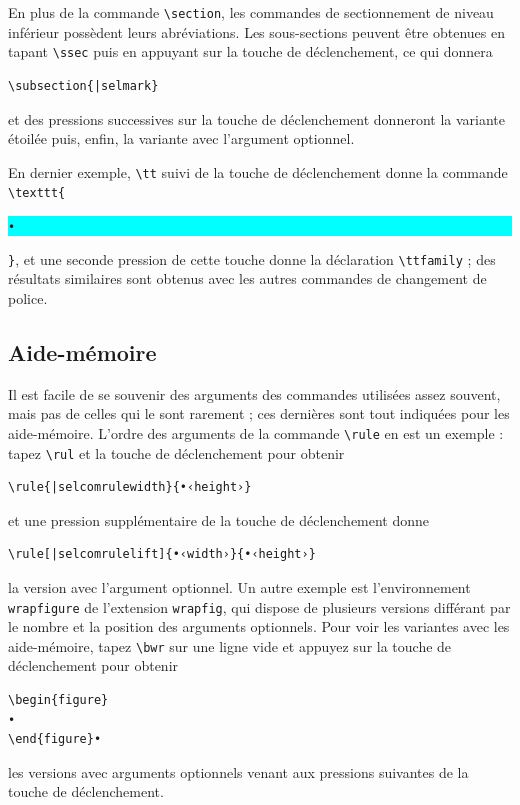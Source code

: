 \documentclass[11pt]{article}
\newcommand{\selmark}{\colorbox{cyan}{\rule[-0.5ex]{0ex}{2.1ex}\texttt{•}}}
\begin{document}
En plus de la commande \verb|\section|, les commandes de sectionnement de niveau inférieur possèdent leurs abréviations. Les sous-sections peuvent être obtenues en tapant \verb|\ssec| puis en appuyant sur la touche de déclenchement, ce qui donnera
\begin{verbatim}
\subsection{|selmark}
\end{verbatim}
et des pressions successives sur la touche de déclenchement donneront la variante étoilée puis, enfin, la variante avec l’argument optionnel.

En dernier exemple, \verb|\tt| suivi de la touche de déclenchement donne la commande \verb|\texttt{|\selmark\verb|}|, et une seconde pression de cette touche donne la déclaration \verb|\ttfamily| ; des résultats similaires sont obtenus avec les autres commandes de changement de police.

\subsection*{Aide-mémoire}

Il est facile de se souvenir des arguments des commandes utilisées assez souvent, mais pas de celles qui le sont rarement ; ces dernières sont tout indiquées pour les aide-mémoire. L’ordre des arguments de la commande \verb|\rule| en est un exemple : tapez \verb|\rul| et la touche de déclenchement pour obtenir
\begin{verbatim}
\rule{|selcomrulewidth}{•‹height›}
\end{verbatim}
et une pression supplémentaire de la touche de déclenchement donne
\begin{verbatim}
\rule[|selcomrulelift]{•‹width›}{•‹height›}
\end{verbatim}
la version avec l’argument optionnel. Un autre exemple est l’environnement \texttt{wrapfigure} de l’extension \texttt{wrapfig}, qui dispose de plusieurs versions différant par le nombre et la position des arguments optionnels. Pour voir les variantes avec les aide-mémoire, tapez \verb|\bwr| sur une ligne vide et appuyez sur la touche de déclenchement pour obtenir
\begin{verbatim}
\begin{figure}
•
\end{figure}•
\end{verbatim}
les versions avec arguments optionnels venant aux pressions suivantes de la touche de déclenchement.
\end{document}
